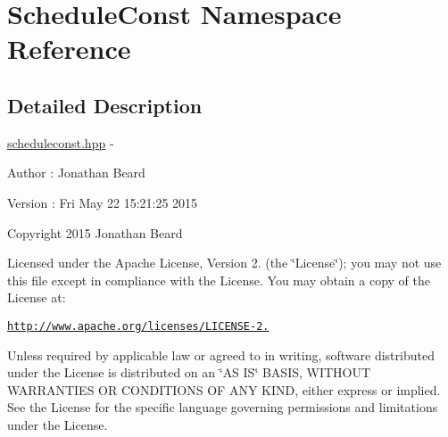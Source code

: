 \hypertarget{namespace_schedule_const}{}\section{Schedule\+Const Namespace Reference}
\label{namespace_schedule_const}


\subsection{Detailed Description}
\hyperlink{scheduleconst_8hpp_source}{scheduleconst.\+hpp} -\/ \begin{DoxyAuthor}{Author}
\+: Jonathan Beard 
\end{DoxyAuthor}
\begin{DoxyVersion}{Version}
\+: Fri May 22 15\+:21\+:25 2015
\end{DoxyVersion}
Copyright 2015 Jonathan Beard

Licensed under the Apache License, Version 2. (the \char`\"{}\+License\char`\"{}); you may not use this file except in compliance with the License. You may obtain a copy of the License at\+:

\href{http://www.apache.org/licenses/LICENSE-2.0}{\tt http\+://www.\+apache.\+org/licenses/\+L\+I\+C\+E\+N\+S\+E-\/2.}

Unless required by applicable law or agreed to in writing, software distributed under the License is distributed on an \char`\"{}\+A\+S I\+S\char`\"{} B\+A\+S\+I\+S, W\+I\+T\+H\+O\+U\+T W\+A\+R\+R\+A\+N\+T\+I\+E\+S O\+R C\+O\+N\+D\+I\+T\+I\+O\+N\+S O\+F A\+N\+Y K\+I\+N\+D, either express or implied. See the License for the specific language governing permissions and limitations under the License. 